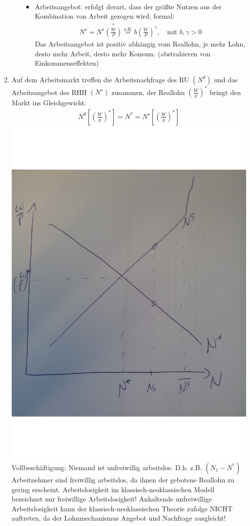 \documentclass{scrartcl}
\begin{document}
\begin{enumerate}
\begin{itemize}
\begin{itemize}
\begin{align*}
        \end{align*}
    \item Arbeitsangebot: erfolgt derart, dass der gr\"{o}{\ss}te Nutzen aus der Kombination von Arbeit gezogen wird, formal:
    \begin{align*}
      N^s = N^s\overset{+}{\left(\frac{W}{P}\right)} \overset{\text{z.B.}}{=} b \left(\frac{W}{P}\right)^\gamma, \quad \text{mit } b,\gamma >0
    \end{align*}
    Das Arbeitsangebot ist positiv abh\"{a}ngig vom Reallohn, je mehr Lohn, desto mehr Arbeit, desto mehr Konsum. (abstrahieren von Einkommenseffekten)
  \end{itemize}
  \end{itemize}
\item Auf dem Arbeitsmarkt treffen die Arbeitsnachfrage des RU $(N^d)$ und das Arbeitsangebot des RHH $(N^s)$ zusammen, der Reallohn $\left(\frac{W}{p}\right)^*$ bringt den Markt ins Gleichgewicht.
    \begin{align*}
      N^d\left[\left(\frac{W}{p}\right)^*\right] = N^* = N^s\left[\left(\frac{W}{p}\right)^*\right]
    \end{align*}
  \includegraphics[width=.5\textwidth]{Bilder/Klassik_Arbeitsmarkt.pdf}\\
  Vollbesch\"{a}ftigung: Niemand ist unfreiwillig arbeitslos. D.h. z.B. $(N_1-N^*)$ Arbeitnehmer sind freiwillig arbeitslos, da ihnen der gebotene Reallohn zu gering erscheint. Arbeitslosigkeit im klassisch-neoklassischen Modell bezeichnet nur freiwillige Arbeitslosigkeit! Anhaltende unfreiwillige Arbeitslosigkeit kann der klassisch-neoklassischen Theorie zufolge NICHT auftreten, da der Lohnmechanismus Angebot und Nachfrage ausgleicht!

\end{enumerate}
\end{document}

